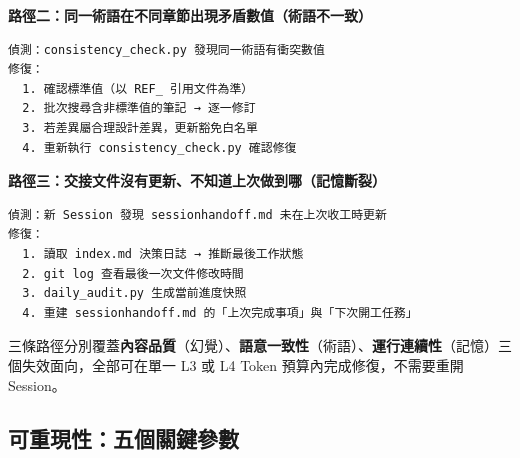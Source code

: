 \textbf{路徑二：同一術語在不同章節出現矛盾數值（術語不一致）}

\begin{verbatim}
偵測：consistency_check.py 發現同一術語有衝突數值
修復：
  1. 確認標準值（以 REF_ 引用文件為準）
  2. 批次搜尋含非標準值的筆記 → 逐一修訂
  3. 若差異屬合理設計差異，更新豁免白名單
  4. 重新執行 consistency_check.py 確認修復
\end{verbatim}

\textbf{路徑三：交接文件沒有更新、不知道上次做到哪（記憶斷裂）}

\begin{verbatim}
偵測：新 Session 發現 sessionhandoff.md 未在上次收工時更新
修復：
  1. 讀取 index.md 決策日誌 → 推斷最後工作狀態
  2. git log 查看最後一次文件修改時間
  3. daily_audit.py 生成當前進度快照
  4. 重建 sessionhandoff.md 的「上次完成事項」與「下次開工任務」
\end{verbatim}

三條路徑分別覆蓋\textbf{內容品質}（幻覺）、\textbf{語意一致性}（術語）、\textbf{運行連續性}（記憶）三個失效面向，全部可在單一
L3 或 L4 Token 預算內完成修復，不需要重開 Session。

\subsection{可重現性：五個關鍵參數}\label{ux53efux91cdux73feux6027ux4e94ux500bux95dcux9375ux53c3ux6578}

